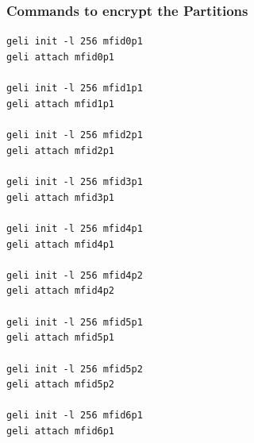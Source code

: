 \subsubsection{Commands to   \Gls{encrypt} the Partitions}
\texttt{geli init -l 256 mfid0p1}\\
\texttt{geli attach mfid0p1}\\\\
\texttt{geli init -l 256 mfid1p1}\\
\texttt{geli attach mfid1p1}\\\\
\texttt{geli init -l 256 mfid2p1}\\
\texttt{geli attach mfid2p1}\\\\
\texttt{geli init -l 256 mfid3p1}\\
\texttt{geli attach mfid3p1}\\\\
\texttt{geli init -l 256 mfid4p1}\\
\texttt{geli attach mfid4p1}\\\\
\texttt{geli init -l 256 mfid4p2}\\
\texttt{geli attach mfid4p2}\\\\
\texttt{geli init -l 256 mfid5p1}\\
\texttt{geli attach mfid5p1}\\\\
\texttt{geli init -l 256 mfid5p2}\\
\texttt{geli attach mfid5p2}\\\\
\texttt{geli init -l 256 mfid6p1}\\
\texttt{geli attach mfid6p1}\\\\
